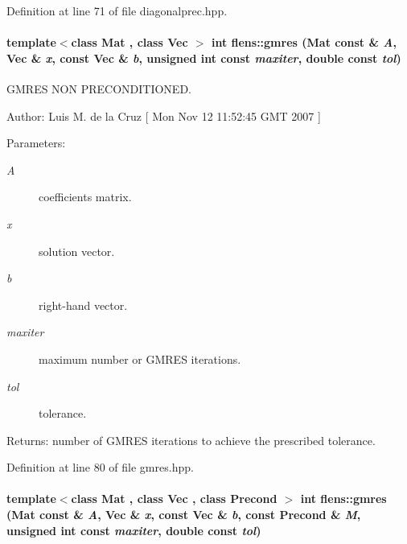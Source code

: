 Definition at line 71 of file diagonalprec.hpp.\hypertarget{namespaceflens_b42c85e91ab78586f4d7d5940b53c620}{
\paragraph[{gmres}]{\setlength{\rightskip}{0pt plus 5cm}template$<$class Mat , class Vec $>$ int flens::gmres ({\bf Mat} const \& {\em A}, \/  {\bf Vec} \& {\em x}, \/  const {\bf Vec} \& {\em b}, \/  unsigned int const  {\em maxiter}, \/  double const  {\em tol})}\hfill}
\label{namespaceflens_b42c85e91ab78586f4d7d5940b53c620}


GMRES NON PRECONDITIONED. 

\begin{Desc}
\item[Author:]Luis M. de la Cruz \mbox{[} Mon Nov 12 11:52:45 GMT 2007 \mbox{]} \end{Desc}
\begin{Desc}
\item[Parameters:]
\begin{description}
\item[{\em A}]coefficients matrix. \item[{\em x}]solution vector. \item[{\em b}]right-hand vector. \item[{\em maxiter}]maximum number or GMRES iterations. \item[{\em tol}]tolerance. \end{description}
\end{Desc}
\begin{Desc}
\item[Returns:]number of GMRES iterations to achieve the prescribed tolerance. \end{Desc}


Definition at line 80 of file gmres.hpp.\hypertarget{namespaceflens_33e1ebd5957027ca909b9738ee6f2054}{
\paragraph[{gmres}]{\setlength{\rightskip}{0pt plus 5cm}template$<$class Mat , class Vec , class Precond $>$ int flens::gmres ({\bf Mat} const \& {\em A}, \/  {\bf Vec} \& {\em x}, \/  const {\bf Vec} \& {\em b}, \/  const Precond \& {\em M}, \/  unsigned int const  {\em maxiter}, \/  double const  {\em tol})}\hfill}
\label{namespaceflens_33e1ebd5957027ca909b9738ee6f2054}


